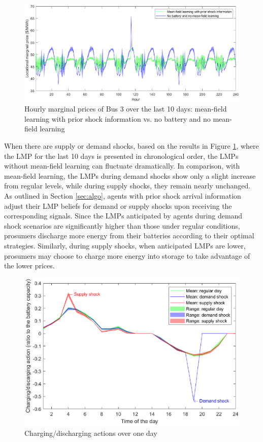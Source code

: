 \documentclass{article}
\theoremstyle{definition}
\theoremstyle{plain}
\begin{document}
\begin{figure}[!h]
    \centering
    \includegraphics[width=\textwidth]{meanfieldcomparelast10.eps}
   \caption{Hourly marginal prices of Bus 3 over the last 10 days: mean-field learning with prior shock information vs. no battery and no mean-field learning}
    \label{fig:l10days}
    {}
\end{figure}
When there are supply or demand shocks, based on the results in Figure \ref{fig:l10days},  where the LMP for the last 10 days is presented in chronological order, the LMPs without mean-field learning can fluctuate dramatically. In comparison, with mean-field learning, the LMPs during demand shocks show only a slight increase from regular levels, while during supply shocks, they remain nearly unchanged.
As outlined in Section \ref{sec:algo}, agents with prior shock arrival information adjust their LMP beliefs for demand or supply shocks upon receiving the corresponding signals. Since the LMPs anticipated by agents during demand shock scenarios are significantly higher than those under regular conditions, prosumers discharge more energy from their batteries according to their optimal strategies. Similarly, during supply shocks, when anticipated LMPs are lower, prosumers may choose to charge more energy into storage to take advantage of the lower prices.
\begin{figure}[!htb]
\centering
    \includegraphics[scale=0.8]{Charging_action2.eps}
   \caption{Charging/discharging actions over one day}
    \label{fig:action}    
\end{figure}
\end{document}
